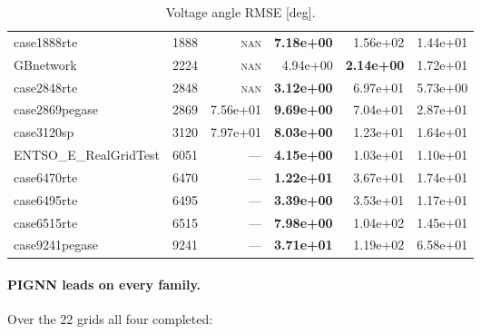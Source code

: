 \documentclass[10pt]{article}
\begin{document}
\begin{table}[H]
\begin{tabular}{lr rrrr}
case1888rte & 1888 & \textsc{nan} & \textbf{7.18e+00} & 1.56e+02 & 1.44e+01 \\
GBnetwork & 2224 & \textsc{nan} & 4.94e+00 & \textbf{2.14e+00} & 1.72e+01 \\
case2848rte & 2848 & \textsc{nan} & \textbf{3.12e+00} & 6.97e+01 & 5.73e+00 \\
case2869pegase & 2869 & 7.56e+01 & \textbf{9.69e+00} & 7.04e+01 & 2.87e+01 \\
case3120sp & 3120 & 7.97e+01 & \textbf{8.03e+00} & 1.23e+01 & 1.64e+01 \\
ENTSO\_E\_RealGridTest & 6051 & --- & \textbf{4.15e+00} & 1.03e+01 & 1.10e+01 \\
case6470rte & 6470 & --- & \textbf{1.22e+01} & 3.67e+01 & 1.74e+01 \\
case6495rte & 6495 & --- & \textbf{3.39e+00} & 3.53e+01 & 1.17e+01 \\
case6515rte & 6515 & --- & \textbf{7.98e+00} & 1.04e+02 & 1.45e+01 \\
case9241pegase & 9241 & --- & \textbf{3.71e+01} & 1.19e+02 & 6.58e+01 \\
\bottomrule
\end{tabular}
\caption{Voltage angle RMSE [deg].}
\end{table}

\paragraph{PIGNN leads on every family.} Over the 22 grids all four completed:
\end{document}
